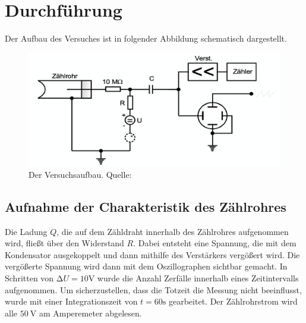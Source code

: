 \section{Durchführung}
\label{sec:Durchführung}
Der Aufbau des Versuches ist in folgender Abbildung schematisch dargestellt.
  \begin{figure}[H]
    \centering
      \includegraphics[scale=0.6]{content/AufbauV703.png}
      \caption{Der Versuchsaufbau. Quelle:\cite{AP01}}
      \label{fig:aufbau3}
  \end{figure}
\noindent
\subsection{Aufnahme der Charakteristik des Zählrohres}
    Die Ladung $Q$, die auf dem Zähldraht innerhalb des Zählrohres aufgenommen wird, fließt über den
    Widerstand $R$. Dabei entsteht eine Spannung, die mit dem Kondensator ausgekoppelt und dann
    mithilfe des Verstärkers vergößert wird. Die vergößerte Spannung wird dann mit dem Oszillographen
    sichtbar gemacht. In Schritten von $\increment U = 10 \si{\volt}$ wurde die Anzahl Zerfälle
    innerhalb eines Zeitintervalls aufgenommen. Um sicherzustellen, dass die Totzeit die Messung nicht
    beeinflusst, wurde mit einer Integrationszeit von $t = 60 \si{\second}$ gearbeitet. Der
    Zählrohrstrom wird alle $\SI{50}{\volt}$ am Amperemeter abgelesen.
